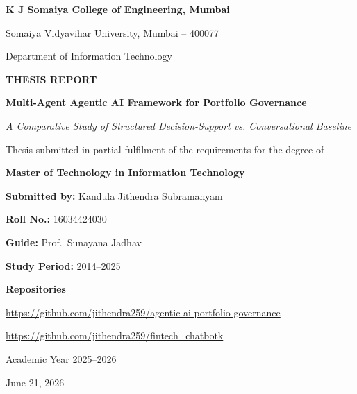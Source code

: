 \documentclass[11pt]{article}
\newcommand{\thesistitle}{Multi-Agent Agentic AI Framework for Portfolio Governance}
\newcommand{\thesissubtitle}{A Comparative Study of Structured Decision-Support vs. Conversational Baseline}
\newcommand{\thesisauthor}{Kandula Jithendra Subramanyam}
\newcommand{\thesisrollno}{16034424030}
\newcommand{\thesisguide}{Prof.\ Sunayana Jadhav}
\begin{document}
\hypersetup{pageanchor=false}

\begin{titlepage}
\centering
{\Large\bfseries K J Somaiya College of Engineering, Mumbai\par}
\vspace{0.25cm}
{\large Somaiya Vidyavihar University, Mumbai -- 400077\par}
\vspace{0.6cm}
{\large Department of Information Technology\par}
\vspace{1.0cm}
{\LARGE\bfseries THESIS REPORT\par}
\vspace{0.7cm}
{\LARGE\bfseries \thesistitle\par}
\vspace{0.35cm}
{\large\itshape \thesissubtitle\par}
\vspace{1.1cm}
{\large Thesis submitted in partial fulfilment of the requirements for the degree of\par}
\vspace{0.2cm}
{\Large\bfseries Master of Technology in Information Technology\par}
\vspace{1.0cm}
{\large \textbf{Submitted by:} \thesisauthor\par}
\vspace{0.2cm}
{\large \textbf{Roll No.:} \thesisrollno\par}
\vspace{0.5cm}
{\large \textbf{Guide:} \thesisguide\par}
\vspace{0.5cm}
{\large \textbf{Study Period:} 2014--2025\par}
\vfill
{\large \textbf{Repositories}\par}
\vspace{0.3cm}
\url{https://github.com/jithendra259/agentic-ai-portfolio-governance}\par
\url{https://github.com/jithendra259/fintech_chatbotk}\par
\vfill
{\large Academic Year 2025--2026\par}
\vspace{0.2cm}
{\large June 21, 2026\par}
\end{titlepage}

\hypersetup{pageanchor=true}
\end{document}
